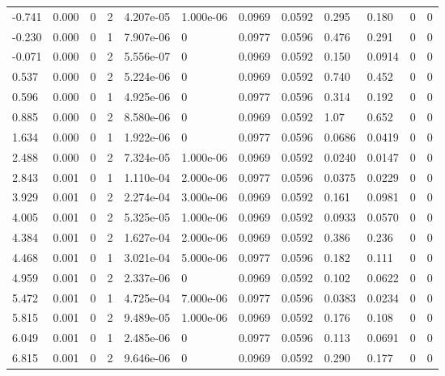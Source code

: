 \documentclass[preview]{standalone}
\begin{document}
{{\begin{tabular}{L{1.2cm}C{1.2cm} C{0.3cm}C{0.5cm} C{1.4cm}C{1.4cm} C{1.4cm}C{1.4cm} C{1.6cm}C{1.6cm} C{1.6cm}C{1.6cm}}
  -0.741  &  0.000  & 0     &  2 &  4.207e-05  & 1.000e-06  &  0.0969&   0.0592& 0.295 & 0.180   &  0 & 0  \\ 
  -0.230  &  0.000  & 0     &  1 &  7.907e-06  & 0  &  0.0977&   0.0596& 0.476 & 0.291   &  0 & 0  \\ 
  -0.071  &  0.000  & 0     &  2 &  5.556e-07  & 0  &  0.0969&   0.0592& 0.150 & 0.0914   &  0 & 0  \\ 
  0.537  &  0.000  & 0     &  2 &  5.224e-06  & 0  &  0.0969&   0.0592& 0.740 & 0.452   &  0 & 0  \\ 
  0.596  &  0.000  & 0     &  1 &  4.925e-06  & 0  &  0.0977&   0.0596& 0.314 & 0.192   &  0 & 0  \\ 
  0.885  &  0.000  & 0     &  2 &  8.580e-06  & 0  &  0.0969&   0.0592& 1.07 & 0.652   &  0 & 0  \\ 
  1.634  &  0.000  & 0     &  1 &  1.922e-06  & 0  &  0.0977&   0.0596& 0.0686 & 0.0419   &  0 & 0  \\ 
  2.488  &  0.000  & 0     &  2 &  7.324e-05  & 1.000e-06  &  0.0969&   0.0592& 0.0240 & 0.0147   &  0 & 0  \\ 
  2.843  &  0.001  & 0     &  1 &  1.110e-04  & 2.000e-06  &  0.0977&   0.0596& 0.0375 & 0.0229   &  0 & 0  \\ 
  3.929  &  0.001  & 0     &  2 &  2.274e-04  & 3.000e-06  &  0.0969&   0.0592& 0.161 & 0.0981   &  0 & 0  \\ 
  4.005  &  0.001  & 0     &  2 &  5.325e-05  & 1.000e-06  &  0.0969&   0.0592& 0.0933 & 0.0570   &  0 & 0  \\ 
  4.384  &  0.001  & 0     &  2 &  1.627e-04  & 2.000e-06  &  0.0969&   0.0592& 0.386 & 0.236   &  0 & 0  \\ 
  4.468  &  0.001  & 0     &  1 &  3.021e-04  & 5.000e-06  &  0.0977&   0.0596& 0.182 & 0.111   &  0 & 0  \\ 
  4.959  &  0.001  & 0     &  2 &  2.337e-06  & 0  &  0.0969&   0.0592& 0.102 & 0.0622   &  0 & 0  \\ 
  5.472  &  0.001  & 0     &  1 &  4.725e-04  & 7.000e-06  &  0.0977&   0.0596& 0.0383 & 0.0234   &  0 & 0  \\ 
  5.815  &  0.001  & 0     &  2 &  9.489e-05  & 1.000e-06  &  0.0969&   0.0592& 0.176 & 0.108   &  0 & 0  \\ 
  6.049  &  0.001  & 0     &  1 &  2.485e-06  & 0  &  0.0977&   0.0596& 0.113 & 0.0691   &  0 & 0  \\ 
  6.815  &  0.001  & 0     &  2 &  9.646e-06  & 0  &  0.0969&   0.0592& 0.290 & 0.177   &  0 & 0  \\ 

\end{tabular}}}
\end{document}
